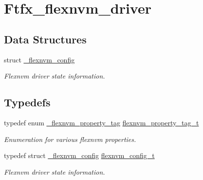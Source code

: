 \hypertarget{group__ftfx__flexnvm__driver}{}\section{Ftfx\+\_\+flexnvm\+\_\+driver}
\label{group__ftfx__flexnvm__driver}
\subsection*{Data Structures}
\begin{DoxyCompactItemize}
\item 
struct \mbox{\hyperlink{struct__flexnvm__config}{\+\_\+flexnvm\+\_\+config}}
\begin{DoxyCompactList}\small\item\em Flexnvm driver state information. \end{DoxyCompactList}\end{DoxyCompactItemize}
\subsection*{Typedefs}
\begin{DoxyCompactItemize}
\item 
\mbox{\label{group__ftfx__flexnvm__driver_ga355e24679a7d7d1228641e96806c19d9}} 
typedef enum \mbox{\hyperlink{group__ftfx__flexnvm__driver_ga562d369144a5774490de42bfdd66c17b}{\+\_\+flexnvm\+\_\+property\+\_\+tag}} \mbox{\hyperlink{group__ftfx__flexnvm__driver_ga355e24679a7d7d1228641e96806c19d9}{flexnvm\+\_\+property\+\_\+tag\+\_\+t}}
\begin{DoxyCompactList}\small\item\em Enumeration for various flexnvm properties. \end{DoxyCompactList}\item 
typedef struct \mbox{\hyperlink{struct__flexnvm__config}{\+\_\+flexnvm\+\_\+config}} \mbox{\hyperlink{group__ftfx__flexnvm__driver_ga8fd4d473c0a4b30cac163160fb28a6c1}{flexnvm\+\_\+config\+\_\+t}}
\begin{DoxyCompactList}\small\item\em Flexnvm driver state information. \end{DoxyCompactList}\end{DoxyCompactItemize}
